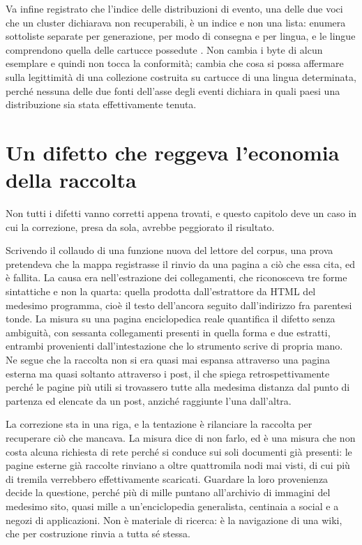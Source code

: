 Va infine registrato che l'indice delle distribuzioni di evento, una delle due voci che un cluster dichiarava non recuperabili, è un indice e non una lista: enumera sottoliste separate per generazione, per modo di consegna e per lingua, e le lingue comprendono quella delle cartucce possedute \cite{bulbapedia-indice-distribuzioni}. Non cambia i byte di alcun esemplare e quindi non tocca la conformità; cambia che cosa si possa affermare sulla legittimità di una collezione costruita su cartucce di una lingua determinata, perché nessuna delle due fonti dell'asse degli eventi dichiara in quali paesi una distribuzione sia stata effettivamente tenuta.

\section{Un difetto che reggeva l'economia della raccolta}

Non tutti i difetti vanno corretti appena trovati, e questo capitolo deve un caso in cui la correzione, presa da sola, avrebbe peggiorato il risultato.

Scrivendo il collaudo di una funzione nuova del lettore del corpus, una prova pretendeva che la mappa registrasse il rinvio da una pagina a ciò che essa cita, ed è fallita. La causa era nell'estrazione dei collegamenti, che riconosceva tre forme sintattiche e non la quarta: quella prodotta dall'estrattore da HTML del medesimo programma, cioè il testo dell'ancora seguito dall'indirizzo fra parentesi tonde. La misura su una pagina enciclopedica reale quantifica il difetto senza ambiguità, con sessanta collegamenti presenti in quella forma e due estratti, entrambi provenienti dall'intestazione che lo strumento scrive di propria mano. Ne segue che la raccolta non si era quasi mai espansa attraverso una pagina esterna ma quasi soltanto attraverso i post, il che spiega retrospettivamente perché le pagine più utili si trovassero tutte alla medesima distanza dal punto di partenza ed elencate da un post, anziché raggiunte l'una dall'altra.

La correzione sta in una riga, e la tentazione è rilanciare la raccolta per recuperare ciò che mancava. La misura dice di non farlo, ed è una misura che non costa alcuna richiesta di rete perché si conduce sui soli documenti già presenti: le pagine esterne già raccolte rinviano a oltre quattromila nodi mai visti, di cui più di tremila verrebbero effettivamente scaricati. Guardare la loro provenienza decide la questione, perché più di mille puntano all'archivio di immagini del medesimo sito, quasi mille a un'enciclopedia generalista, centinaia a social e a negozi di applicazioni. Non è materiale di ricerca: è la navigazione di una wiki, che per costruzione rinvia a tutta sé stessa.

